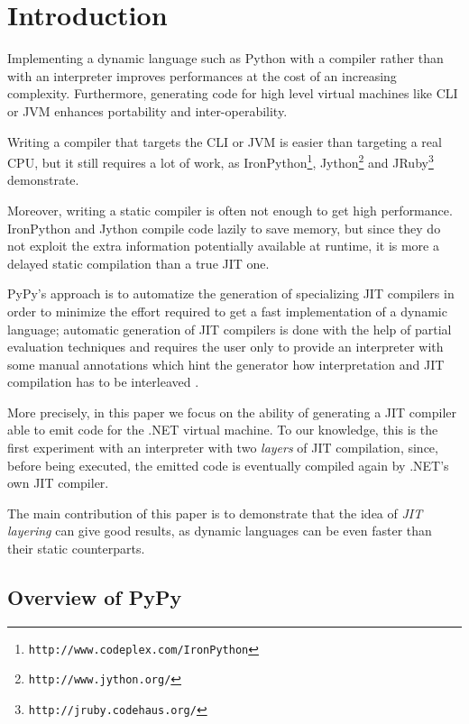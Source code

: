 \section{Introduction}
Implementing a dynamic language such as Python with a compiler rather than with an interpreter improves performances at the cost of
an increasing complexity. Furthermore, generating code for high level virtual machines like CLI or JVM enhances portability and inter-operability.

Writing a compiler that targets the CLI or JVM is easier than targeting a real CPU, but
it still requires a lot of work, as
IronPython\footnote{\texttt{http://www.codeplex.com/IronPython}},
Jython\footnote{\texttt{http://www.jython.org/}}
and JRuby\footnote{\texttt{http://jruby.codehaus.org/}} demonstrate.

Moreover, writing a static compiler is often not enough to get high
performance.  IronPython and Jython compile code lazily to save memory, but
since they do not exploit the extra information potentially available at
runtime, it is more a delayed static compilation than a true JIT one.

PyPy's approach \cite{RiBo07_223} is to automatize the generation of 
specializing JIT compilers in order
to minimize the effort required to get a fast implementation of a
dynamic language; automatic generation of JIT compilers is done with
the help of partial evaluation techniques and requires the user only
to provide an interpreter with some manual annotations which hint
the generator how interpretation and JIT compilation has to be interleaved \cite{PyPyJIT09}.

More precisely, in this paper we focus on the ability of generating a JIT compiler able to emit code
for the .NET virtual machine. To our knowledge, this is the first experiment with an interpreter with
two \emph{layers} of JIT compilation, since, before being executed, the
emitted code is eventually compiled again by .NET's own JIT compiler.

The main contribution of this paper is to demonstrate that the idea of
\emph{JIT layering} can give good results, as dynamic languages can be even
faster than their static counterparts.

\subsection{Overview of PyPy}


